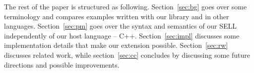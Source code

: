 The rest of the paper is structured as following. Section~\ref{sec:bg} goes 
over some terminology and compares examples written with our library and in 
other languages. Section~\ref{sec:pm} goes over the syntax and semantics of our 
SELL independently of our host language -- C++. Section~\ref{sec:impl} discusses 
some implementation details that make our extension possible. 
Section~\ref{sec:rw} discusses related work, while section~\ref{sec:cc} 
concludes by discussing some future directions and possible improvements.
